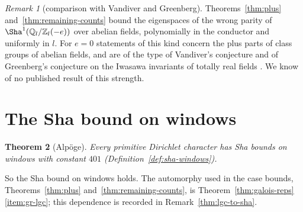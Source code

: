 \documentclass[11pt]{amsbook}
\theoremstyle{plain}
\newtheorem{theorem}{Theorem}[section]
\theoremstyle{definition}
\theoremstyle{remark}
\newtheorem{remark}[theorem]{Remark}
\numberwithin{equation}{section}
\numberwithin{figure}{chapter}
\numberwithin{table}{chapter}
\newcommand{\Q}{\mathbb{Q}}
\newcommand{\Z}{\mathbb{Z}}
\begin{document}
\begin{remark}[comparison with Vandiver and Greenberg]
\label{rem:vandiver}
Theorems~\ref{thm:plus} and~\ref{thm:remaining-counts} bound the
eigenspaces of the wrong parity of $\Sha^1(\Q_l/\Z_l(-e))$ over abelian
fields, polynomially in the conductor and uniformly in $l$. For $e=0$
statements of this kind concern the plus parts of class groups of
abelian fields, and are of the type of Vandiver's conjecture and of
Greenberg's conjecture on the Iwasawa invariants of totally real fields
\cite{Washington1997,Greenberg1976}. We know of no published result of
this strength.
\end{remark}

\section{The Sha bound on windows}

\begin{theorem}[Alp\"oge]\label{thm:sha-windows}
Every primitive Dirichlet character has Sha bounds on windows with
constant $401$ (Definition~\ref{def:sha-windows}).
\end{theorem}

\noindent So the Sha bound on windows holds. The automorphy used in
the case bounds, Theorems~\ref{thm:plus} and~\ref{thm:remaining-counts}, is
Theorem~\ref{thm:galois-reps}\ref{item:gr-lgc}; this dependence is
recorded in Remark~\ref{thm:lgc-to-sha}.
\begin{figure}[tbp]
\centering

\end{figure}
\end{document}
